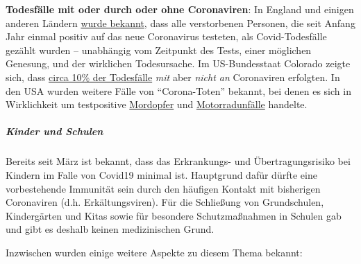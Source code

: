 \textbf{Todesfälle mit oder durch oder ohne Coronaviren}: In England und
einigen anderen Ländern
\href{https://www.cebm.net/covid-19/why-no-one-can-ever-recover-from-covid-19-in-england-a-statistical-anomaly/}{wurde
bekannt}, dass alle verstorbenen Personen, die seit Anfang Jahr einmal
positiv auf das neue Coronavirus testeten, als Covid-Todesfälle gezählt
wurden -- unabhängig vom Zeitpunkt des Tests, einer möglichen Genesung,
und der wirklichen Todesursache. Im US-Bundesstaat Colorado zeigte sich,
dass \href{https://covid19.colorado.gov/data/case-data}{circa 10\% der
Todesfälle} \emph{mit} aber \emph{nicht an} Coronaviren erfolgten. In
den USA wurden weitere Fälle von ``Corona-Toten'' bekannt, bei denen es
sich in Wirklichkeit um testpositive
\href{https://cbs12.com/news/local/i-team-deaths-incorrectly-attributed-to-covid-19-in-palm-beach-county}{Mordopfer}
und
\href{https://www.fox35orlando.com/news/fox-35-investigates-questions-raised-after-fatal-motorcycle-crash-listed-as-covid-19-death}{Motorradunfälle}
handelte.

\hypertarget{kinder-und-schulen}{%
\subparagraph{\texorpdfstring{\textbf{Kinder und
Schulen}}{Kinder und Schulen}}\label{kinder-und-schulen}}

Bereits seit März ist bekannt, dass das Erkrankungs- und
Übertragungsrisiko bei Kindern im Falle von Covid19 minimal ist.
Hauptgrund dafür dürfte eine vorbestehende Immunität sein durch den
häufigen Kontakt mit bisherigen Coronaviren (d.h. Erkältungsviren). Für
die Schließung von Grundschulen, Kindergärten und Kitas sowie für
besondere Schutzmaßnahmen in Schulen gab und gibt es deshalb keinen
medizinischen Grund.

Inzwischen wurden einige weitere Aspekte zu diesem Thema bekannt:

